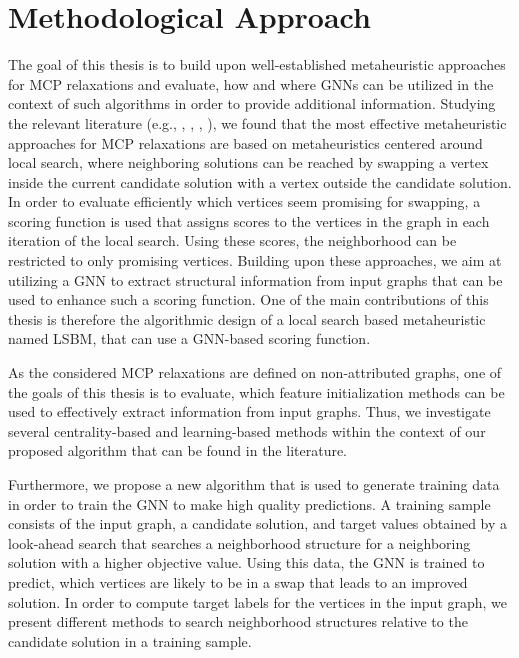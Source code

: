 \documentclass[draft,final]{vutinfth} %
\begin{document}
\section{Methodological Approach}\label{sec:methodology}
The goal of this thesis is to build upon well-established metaheuristic approaches for MCP relaxations and evaluate, how and where GNNs can be utilized in the context of such algorithms in order to provide additional information. 
Studying the relevant literature (e.g., \cite{djeddi_extension_2019}, \cite{zhou_opposition-based_2020}, \cite{chen_nuqclq_2021}, \cite{peng_solving_2021}), we found that the most effective metaheuristic approaches for MCP relaxations are based on metaheuristics centered around local search, where neighboring solutions can be reached by swapping a vertex inside the current candidate solution with a vertex outside the candidate solution. In order to evaluate efficiently which vertices seem promising for swapping, a scoring function is used that assigns scores to the vertices in the graph in each iteration of the local search. Using these scores, the neighborhood can be restricted to only promising vertices. 
Building upon these approaches, we aim at utilizing a GNN to extract structural information from input graphs that can be used to enhance such a scoring function. 
One of the main contributions of this thesis is therefore the algorithmic design of a local search based metaheuristic named LSBM, that can use a GNN-based scoring function. 

As the considered MCP relaxations are defined on non-attributed graphs, one of the goals of this thesis is to evaluate, which feature initialization methods can be used to effectively extract information from input graphs. Thus, we investigate several centrality-based and learning-based methods within the context of our proposed algorithm that can be found in the literature. 

Furthermore, we propose a new algorithm that is used to generate training data in order to train the GNN to make high quality predictions. A training sample consists of the input graph, a candidate solution, and target values obtained by a look-ahead search that searches a neighborhood structure for a neighboring solution with a higher objective value. Using this data, the GNN is trained to predict, which vertices are likely to be in a swap that leads to an improved solution. In order to compute target labels for the vertices in the input graph, we present different methods to search neighborhood structures relative to the candidate solution in a training sample. 
\end{document}
